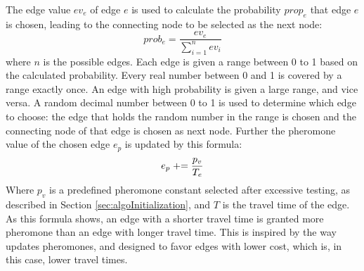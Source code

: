 The edge value $ev_e$ of edge $e$ is used to calculate the probability $prop_e$ that edge $e$ is chosen, leading to the connecting node to be selected as the next node: 
\newline
$$prob_e = \frac{ev_e}{\sum\limits^{n}_{i=1}ev_i}$$
\newline
where $n$ is the possible edges. Each edge is given a range between 0 to 1 based on the calculated probability. Every real number between 0 and 1 is covered by a range exactly once. An edge with high probability is given a large range, and vice versa. A random decimal number between 0 to 1 is used to determine which edge to choose: the edge that holds the random number in the range is chosen and the connecting node of that edge is chosen as next node. Further the pheromone value of the chosen edge $e_p$ is updated by this formula:
\newline
$$e_p \mathrel{+}= \frac{p_v}{T_e}$$ 
\newline
Where $p_v$ is a predefined pheromone constant selected after excessive testing, as described in Section \vref{sec:algoInitialization}, and $T$ is the travel time of the edge. As this formula shows, an edge with a shorter travel time is granted more pheromone than an edge with longer travel time. This is inspired by the way \citet{hsiao04} updates pheromones, and designed to favor edges with lower cost, which is, in this case, lower travel times. 